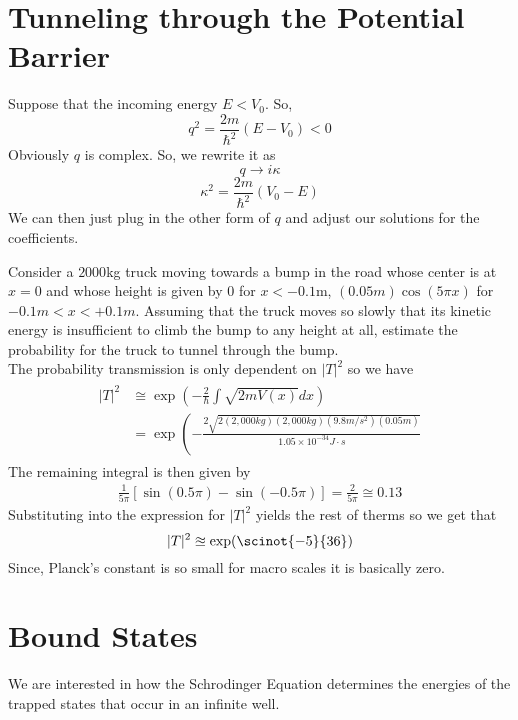 \section{Tunneling through the Potential Barrier}
 Suppose that the incoming energy $ E < V_0 $. So, 
 \[ q^2 = \frac{2m}{\hbar^2} (E-V_0) < 0 \]
 Obviously $ q $ is complex. So, we rewrite it as 
 \[ q \rightarrow i \kappa \]
 \[ \kappa^2 = \frac{2m}{\hbar^2} (V_0 - E) \]
We can then just plug in the other form of $ q $ and adjust our solutions for the coefficients. 
\begin{example}
	Consider a $ 2000 $kg truck moving towards a bump in the road whose center is at $ x = 0 $ and whose height is given by $ 0 $ for $ x<-0.1 $m, $ (0.05m)\cos(5 \pi x)  $ for $ -0.1m < x < +0.1m $. Assuming that the truck moves so slowly that its kinetic energy is insufficient to climb the bump to any height at all, estimate the probability for the truck to tunnel through the bump. \\
	The probability transmission is only dependent on $ |T|^2 $ so we have 
	\begin{align*}
	\begin{aligned} | T | ^ { 2 } & \cong \exp \left( - \frac { 2 } { \hbar } \int \sqrt { 2 m V ( x ) } d x \right) \\ & = \exp \left( - \frac { 2 \sqrt { 2 ( 2,000 k g ) ( 2,000 k g ) \left( 9.8 m / s ^ { 2 } \right) ( 0.05 m ) } } { 1.05 \times 10 ^ { - 34 } J \cdot s } \right. \end{aligned}
	\end{align*}
	The remaining integral is then given by
	\begin{align*}
	\frac { 1 } { 5 \pi } [ \sin ( 0.5 \pi ) - \sin ( - 0.5 \pi ) ] = \frac { 2 } { 5 \pi } \cong 0.13
	\end{align*}
	Substituting into the expression for $ |T|^2 $ yields the rest of therms so we get that 
	\[ |T|^2 \approxeq \exp(\scinot{-5}{36}) \]
	Since, Planck's constant is so small for macro scales it is basically zero. 
\section{Bound States}
	We are interested in how the Schrodinger Equation determines the energies of the trapped states that occur in an infinite well. 
\end{example}
